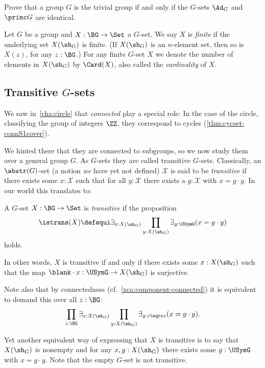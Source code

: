 \begin{xca}\label{xca:Ad-princ-trivial}
  Prove that a group $G$ is the trivial group if and only if 
  the $G$-sets $\Ad_G$ and $\princ G$ are identical.
\end{xca}

\begin{definition}\label{def:finite-G-set}
Let $G$ be a group and $X:\BG\to\Set$ a $G$-set.
We say $X$ is \emph{finite} if the underlying set $X(\sh_G)$ is finite.
(If $X(\sh_G)$ is an $n$-element set, then so is $X(z)$, for any $z:\BG$.)
For any finite $G$-set $X$ we denote the number of elements
in $X(\sh_G)$ by $\Card(X)$, also called the \emph{cardinality} of $X$.
\end{definition}

\subsection{Transitive $G$-sets}
\label{sec:transitiveGsets}
We saw in~\cref{cha:circle} that \emph{connected \coverings}
play a special role:
In the case of the circle, classifying the group of integers $\ZZ$,
they correspond to cycles (\cref{thm:cycset-connS1cover}).

We hinted there that they are connected to subgroups, so
we now study them over a general group $G$.
As $G$-sets they are called transitive $G$-sets.
Classically, an $\abstr(G)$-set (a notion \emph{we} have yet not defined) $\mathcal X$ is said to be \emph{transitive} if there exists some $x:\mathcal X$ such that for all $y:\mathcal X$ there exists a $g:\mathcal X$ with $x=g\cdot y$.  In our world this translates to:
\begin{definition}\label{def:transitiveGset}
  A $G$-set $X:\BG\to\Set$ is \emph{transitive} if the proposition
  \[
    \istrans(X) \defequi
    \exists_{x:X(\sh_G)} \prod_{y:X(\sh_G)} \exists_{g:\USymG} (x=g\cdot y)
  \]
  holds.
\end{definition}
\begin{remark}
  In other words, $X$ is transitive if and only if there exists
  some $x:X(\sh_G)$ such that the map $\blank\cdot x:\USymG\to X(\sh_G)$ is
  surjective.

  Note also that by connectedness (cf.~\cref{xca:component-connected})
  it is equivalent to demand this over all $z:\BG$:
  \begin{equation}\label{eq:Gset-trans-gen}
    \prod_{z:\BG}\exists_{x:X(\sh_G)}
    \prod_{y:X(\sh_G)}\exists_{g:z\eqto z}(x=g\cdot y).
  \end{equation}

  Yet another equivalent way of expressing that $X$ is transitive is to say
  that $X(\sh_G)$ is nonempty and for any $x,y:X(\sh_G)$ there
  exists some $g:\USymG$ with $x = g\cdot y$.
  Note that the empty $G$-set is not transitive.
\end{remark}

